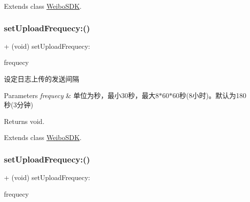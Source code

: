 Extends class \mbox{\hyperlink{interface_weibo_s_d_k_a6790cf45454697f2b846eb080a130ef2}{Weibo\+S\+DK}}.

\mbox{\label{category_weibo_s_d_k_07_statistics_08_a6790cf45454697f2b846eb080a130ef2}} 
\subsubsection{\texorpdfstring{set\+Upload\+Frequecy\+:()}{setUploadFrequecy:()}\hspace{0.1cm}{\footnotesize\ttfamily [2/3]}}
{\footnotesize\ttfamily + (void) set\+Upload\+Frequecy\+: \begin{DoxyParamCaption}\item[{(N\+S\+Time\+Interval)}]{frequecy }\end{DoxyParamCaption}}

设定日志上传的发送间隔 
\begin{DoxyParams}{Parameters}
{\em frequecy} & 单位为秒，最小30秒，最大8$\ast$60$\ast$60秒(8小时)。默认为180秒(3分钟) \\
\hline
\end{DoxyParams}
\begin{DoxyReturn}{Returns}
void. 
\end{DoxyReturn}


Extends class \mbox{\hyperlink{interface_weibo_s_d_k_a6790cf45454697f2b846eb080a130ef2}{Weibo\+S\+DK}}.

\mbox{\label{category_weibo_s_d_k_07_statistics_08_a6790cf45454697f2b846eb080a130ef2}} 
\subsubsection{\texorpdfstring{set\+Upload\+Frequecy\+:()}{setUploadFrequecy:()}\hspace{0.1cm}{\footnotesize\ttfamily [3/3]}}
{\footnotesize\ttfamily + (void) set\+Upload\+Frequecy\+: \begin{DoxyParamCaption}\item[{(N\+S\+Time\+Interval)}]{frequecy }\end{DoxyParamCaption}}

